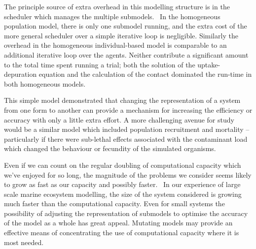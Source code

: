 \documentclass{article}
\begin{document}
The principle source of extra overhead in this modelling structure is in the
scheduler which manages the multiple submodels. \ In the homogeneous
population model, there is only one submodel running, and the extra cost of
the more general scheduler over a simple iterative loop is negligible.
Similarly the overhead in the homogeneous individual-based model is comparable
to an additional iterative loop over the agents. Neither contribute a
significant amount to the total time spent running a trial; both the solution
of the uptake-depuration equation and the calculation of the contact dominated
the run-time in both homogeneous models.

This simple model demonstrated that changing the representation of a system
from one form to another can provide a mechanism for increasing the efficiency
or accuracy with only a little extra effort. A more challenging avenue for
study would be a similar model which included population recruitment and
mortality -- particularly if there were sub-lethal effects associated with the
contaminant load which changed the behaviour or fecundity of the simulated
organisms.

Even if we can count on the regular doubling of computational capacity which
we've enjoyed for so long, the magnitude of the problems we consider seems
likely to grow as fast as our capacity and possibly faster. \ In our
experience of large scale marine ecosystem modelling, the size of the system
considered is growing much faster than the computational capacity. Even for
small systems the possibility of adjusting the representation of submodels to
optimise the accuracy of the model as a whole has great appeal. Mutating
models may provide an effective means of concentrating the use of
computational capacity where it is most needed. \
\end{document}

